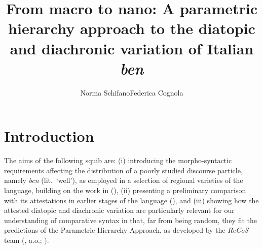 \documentclass[output=paper]{langsci/langscibook}
\author{Norma Schifano\affiliation{University of Birmingham}\lastand Federica
Cognola\affiliation{La Sapienza University, Rome}}
\title{From macro to nano: A parametric hierarchy approach to the diatopic and
diachronic variation of Italian \textit{ben}}
\begin{document}
\glsresetall


\section{Introduction}

The aims of the following squib are: (i) introducing the morpho-syntactic
requirements affecting the distribution of a poorly studied discourse particle,
namely  \emph{ben} (lit.\ ‘well’), as employed in a selection of regional
varieties of the language, building on the work in
\textcite{CognSchi2015,CognSchi2018b,CognSchi2018} (),
(ii) presenting a preliminary comparison with its attestations in earlier
stages of the language (), and (iii) showing how the
attested diatopic and diachronic variation are particularly relevant for our
understanding of comparative syntax in that, far from being random, they fit
the predictions of the Parametric Hierarchy Approach, as developed by the
\emph{ReCoS} team
(\citealt{Roberts2012,BibRob2012,BibRob2015,BibRob2016,BibHolRobShee2014,BibRobShee2014},
a.o.; ).
\end{document}
